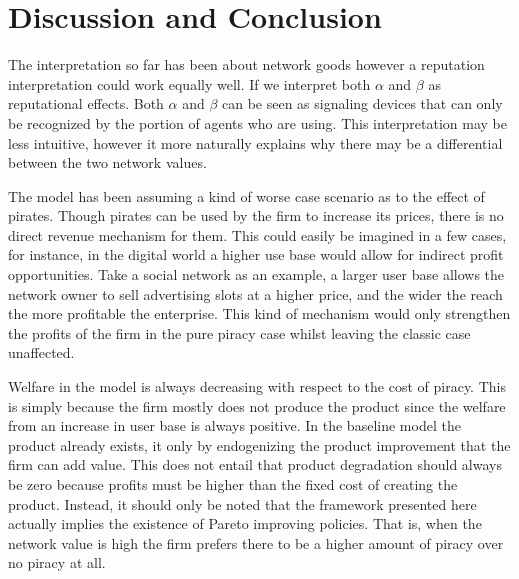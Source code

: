 \documentclass[12pt]{article}
\numberwithin{equation}{section}
\begin{document}
\section{Discussion and Conclusion}
The interpretation so far has been about network goods however a reputation interpretation could work equally well. If we interpret both $\alpha$ and $\beta$ as reputational effects. Both $\alpha$ and $\beta$ can be seen as signaling devices that can only be recognized by the portion of agents who are using. This interpretation may be less intuitive, however it more naturally explains why there may be a differential between the two network values.

The model has been assuming a kind of worse case scenario as to the effect of pirates. Though pirates can be used by the firm to increase its prices, there is no direct revenue mechanism for them. This could easily be imagined in a few cases, for instance, in the digital world a higher use base would allow for indirect profit opportunities. Take a social network as an example, a larger user base allows the network owner to sell advertising slots at a higher price, and the wider the reach the more profitable the enterprise. This kind of mechanism would only strengthen the profits of the firm in the pure piracy case whilst leaving the classic case unaffected. 

Welfare in the model is always decreasing with respect to the cost of piracy. This is simply because the firm mostly does not produce the product since the welfare from an increase in user base is always positive. In the baseline model the product already exists, it only by endogenizing the product improvement that the firm can add value. This does not entail that product degradation should always be zero because profits must be higher than the fixed cost of creating the product. Instead, it should only be noted that the framework presented here actually implies the existence of Pareto improving policies. That is, when the network value is high the firm prefers there to be a higher amount of piracy over no piracy at all. 

\end{document}

